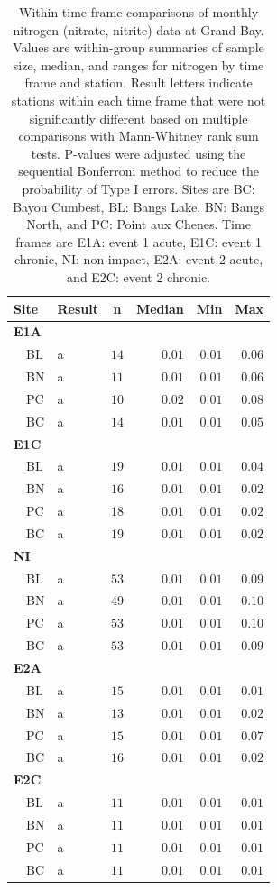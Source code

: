 \documentclass[letterpaper,12pt]{article}\usepackage[]{graphicx}\usepackage[]{color}
\begin{document}
\clearpage

\begin{table}[!tbp]
\caption{Within time frame comparisons of monthly nitrogen (nitrate, nitrite) data at Grand Bay.  Values are within-group summaries of sample size, median, and ranges for nitrogen by time frame and station.  Result letters indicate stations within each time frame that were not significantly different based on multiple comparisons with Mann-Whitney rank sum tests.  P-values were adjusted using the sequential Bonferroni method to reduce the probability of Type I errors. Sites are BC: Bayou Cumbest, BL: Bangs Lake, BN: Bangs North, and PC: Point aux Chenes.  Time frames are E1A: event 1 acute, E1C: event 1 chronic, NI: non-impact, E2A: event 2 acute, and E2C: event 2 chronic.\label{tab:tntab2}} 
\begin{center}
\begin{tabular}{llrrrr}
\hline\hline
\multicolumn{1}{l}{Site}&\multicolumn{1}{c}{Result}&\multicolumn{1}{c}{n}&\multicolumn{1}{c}{Median}&\multicolumn{1}{c}{Min}&\multicolumn{1}{c}{Max}\tabularnewline
\hline
{\bfseries E1A}&&&&&\tabularnewline
~~BL&a&$14$&$0.01$&$0.01$&$0.06$\tabularnewline
~~BN&a&$11$&$0.01$&$0.01$&$0.06$\tabularnewline
~~PC&a&$10$&$0.02$&$0.01$&$0.08$\tabularnewline
~~BC&a&$14$&$0.01$&$0.01$&$0.05$\tabularnewline
\hline
{\bfseries E1C}&&&&&\tabularnewline
~~BL&a&$19$&$0.01$&$0.01$&$0.04$\tabularnewline
~~BN&a&$16$&$0.01$&$0.01$&$0.02$\tabularnewline
~~PC&a&$18$&$0.01$&$0.01$&$0.02$\tabularnewline
~~BC&a&$19$&$0.01$&$0.01$&$0.02$\tabularnewline
\hline
{\bfseries NI}&&&&&\tabularnewline
~~BL&a&$53$&$0.01$&$0.01$&$0.09$\tabularnewline
~~BN&a&$49$&$0.01$&$0.01$&$0.10$\tabularnewline
~~PC&a&$53$&$0.01$&$0.01$&$0.10$\tabularnewline
~~BC&a&$53$&$0.01$&$0.01$&$0.09$\tabularnewline
\hline
{\bfseries E2A}&&&&&\tabularnewline
~~BL&a&$15$&$0.01$&$0.01$&$0.01$\tabularnewline
~~BN&a&$13$&$0.01$&$0.01$&$0.02$\tabularnewline
~~PC&a&$15$&$0.01$&$0.01$&$0.07$\tabularnewline
~~BC&a&$16$&$0.01$&$0.01$&$0.02$\tabularnewline
\hline
{\bfseries E2C}&&&&&\tabularnewline
~~BL&a&$11$&$0.01$&$0.01$&$0.01$\tabularnewline
~~BN&a&$11$&$0.01$&$0.01$&$0.01$\tabularnewline
~~PC&a&$11$&$0.01$&$0.01$&$0.01$\tabularnewline
~~BC&a&$11$&$0.01$&$0.01$&$0.01$\tabularnewline
\hline
\end{tabular}\end{center}

\end{table}
\end{document}
